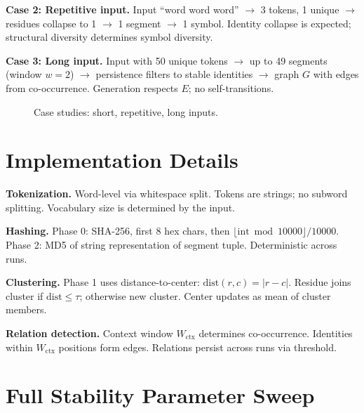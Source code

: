 \textbf{Case 2: Repetitive input.}
Input ``word word word'' $\rightarrow$ 3 tokens, 1 unique $\rightarrow$ residues collapse to 1 $\rightarrow$ 1 segment $\rightarrow$ 1 symbol. Identity collapse is expected; structural diversity determines symbol diversity.

\textbf{Case 3: Long input.}
Input with 50 unique tokens $\rightarrow$ up to 49 segments (window $w=2$) $\rightarrow$ persistence filters to stable identities $\rightarrow$ graph $G$ with edges from co-occurrence. Generation respects $E$; no self-transitions.

\begin{figure}[t]
\centering
{}
\caption{Case studies: short, repetitive, long inputs.}
\label{fig:app:cases}
\end{figure}

\section{Implementation Details}
\label{app:impl}

\textbf{Tokenization.}
Word-level via whitespace split. Tokens are strings; no subword splitting. Vocabulary size is determined by the input.

\textbf{Hashing.}
Phase 0: SHA-256, first 8 hex chars, then $\lfloor \text{int} \bmod 10000 \rfloor / 10000$. Phase 2: MD5 of string representation of segment tuple. Deterministic across runs.

\textbf{Clustering.}
Phase 1 uses distance-to-center: $\text{dist}(r, c) = |r - c|$. Residue joins cluster if $\text{dist} \leq \tau$; otherwise new cluster. Center updates as mean of cluster members.

\textbf{Relation detection.}
Context window $W_{\text{ctx}}$ determines co-occurrence. Identities within $W_{\text{ctx}}$ positions form edges. Relations persist across runs via threshold.

\section{Full Stability Parameter Sweep}
\label{app:stability_full}

